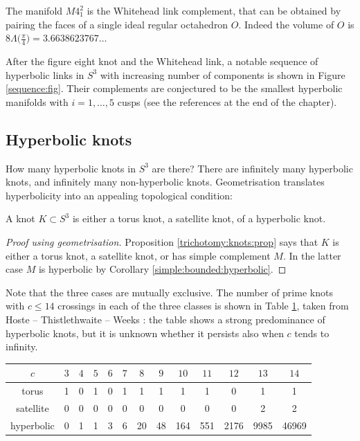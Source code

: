 The manifold $M4_1^2$ is the Whitehead link complement, that can be obtained by pairing the faces of a single ideal regular octahedron $O$. Indeed the volume of $O$ is $8\Lambda\big(\frac {\pi} 4\big) = 3.6638623767\ldots $

After the figure eight knot and the Whitehead link, a notable sequence of hyperbolic links in $S^3$ with increasing number of components is shown in Figure \ref{sequence:fig}. Their complements are conjectured to be the smallest hyperbolic manifolds with $i=1,\ldots, 5$ cusps (see the references at the end of the chapter).

\subsection{Hyperbolic knots}
How many hyperbolic knots in $S^3$ are there? There are infinitely many hyperbolic knots, and infinitely many non-hyperbolic knots. Geometrisation translates hyperbolicity into an appealing topological condition:

\begin{teo}
A knot $K\subset S^3$ is either a torus knot, a satellite knot, of a hyperbolic knot.
\end{teo}
\begin{proof}[Proof using geometrisation]
Proposition \ref{trichotomy:knots:prop} says that $K$ is either a torus knot, a satellite knot, or has simple complement $M$. In the latter case $M$ is hyperbolic by Corollary \ref{simple:bounded:hyperbolic}.
\end{proof}

Note that the three cases are mutually exclusive. The number of prime knots with $c\leqslant 14$ crossings in each of the three classes is shown in Table \ref{torus:satellite:hyperbolic:knots:table}, taken from Hoste -- Thistlethwaite -- Weeks \cite{HTW}: the table shows a strong predominance of hyperbolic knots, but it is unknown whether it persists also when $c$ tends to infinity.

\begin{table}
\begin{center}
\begin{tabular}{c||cccccccccccc}
 $c$       &  
 $3$ & $4$ & $5$ & $6$ & $7$ & $8$
 & $9$ & $10$ & $11$ & $12$ & $13$ & $14$ \\
 \hline \hline
torus & 
1 & 0 & 1 & 0 & 1 & 1 & 1 & 1 & 1 & 0 & 1 & 1 \\
satellite & 0 & 0 & 0 & 0 & 0 & 0 & 0 & 0 & 0 & 0 & 2 & 2 \\
hyperbolic & 
0 & 1 & 1 & 3 & 6 & 20 & 48 & 164 & 551 & 2176 & 9985 & 46969 
 \end{tabular}
\vspace{.2 cm}
\label{torus:satellite:hyperbolic:knots:table}
\end{center}
\end{table}


